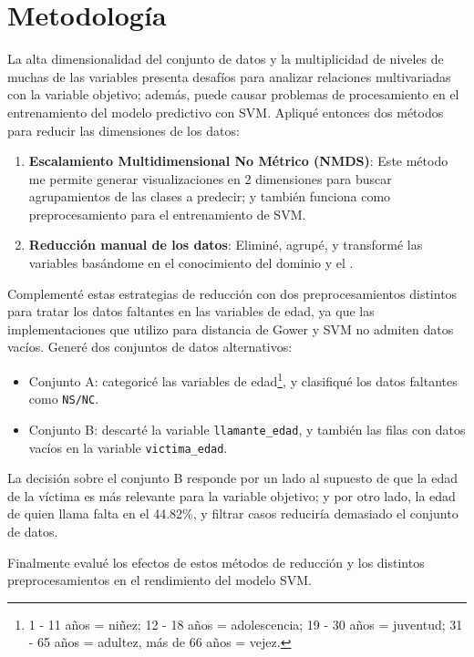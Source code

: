 \documentclass[10 pt]{article}
\begin{document}
\section{Metodología}\label{met}

La alta dimensionalidad del conjunto de datos y la multiplicidad de niveles de muchas de las variables presenta desafíos para analizar relaciones multivariadas con la variable objetivo; además, puede causar problemas de procesamiento en el entrenamiento del modelo predictivo con SVM. Apliqué entonces dos métodos para reducir las dimensiones de los datos:
\begin{enumerate}
    \item \textbf{Escalamiento Multidimensional No Métrico (NMDS)}: Este método me permite generar visualizaciones en 2 dimensiones para buscar agrupamientos de las clases a predecir; y también funciona como preprocesamiento para el entrenamiento de SVM.
    \item \textbf{Reducción manual de los datos}: Eliminé, agrupé, y transformé las variables basándome en el conocimiento del dominio y el .
\end{enumerate}

Complementé estas estrategias de reducción con dos preprocesamientos distintos para tratar los datos faltantes en las variables de edad, ya que las implementaciones que utilizo para distancia de Gower y SVM no admiten datos vacíos. Generé dos conjuntos de datos alternativos:
\begin{itemize}
    \item Conjunto A: categoricé las variables de edad\footnote{1 - 11 años = niñez; 12 - 18 años = adolescencia; 19 - 30 años = juventud; 31 - 65 años = adultez, más de 66 años = vejez.}, y clasifiqué los datos faltantes como \texttt{NS/NC}.
    \item Conjunto B: descarté la variable \texttt{llamante\_edad}, y también las filas con datos vacíos en la variable \texttt{victima\_edad}.  
\end{itemize}

La decisión sobre el conjunto B responde por un lado al supuesto de que la edad de la víctima es más relevante para la variable objetivo; y por otro lado, la edad de quien llama falta en el 44.82\%, y filtrar casos reduciría demasiado el conjunto de datos.

Finalmente evalué los efectos de estos métodos de reducción y los distintos preprocesamientos en el rendimiento del modelo SVM.
\end{document}
